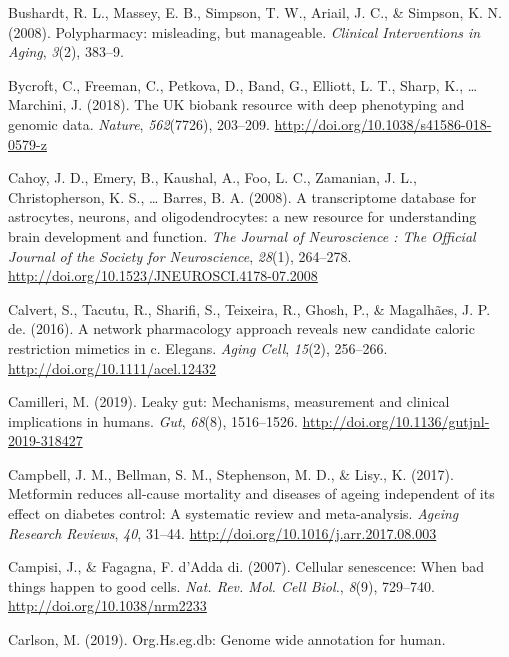 \documentclass[12pt,twoside]{unicam}
\begin{document}
\begin{cslreferences}
\leavevmode\hypertarget{ref-Bushardt2008}{}%
Bushardt, R. L., Massey, E. B., Simpson, T. W., Ariail, J. C., \& Simpson, K. N. (2008). Polypharmacy: misleading, but manageable. \emph{Clinical Interventions in Aging}, \emph{3}(2), 383--9.

\leavevmode\hypertarget{ref-Bycroft2018}{}%
Bycroft, C., Freeman, C., Petkova, D., Band, G., Elliott, L. T., Sharp, K., \ldots{} Marchini, J. (2018). The UK biobank resource with deep phenotyping and genomic data. \emph{Nature}, \emph{562}(7726), 203--209. \url{http://doi.org/10.1038/s41586-018-0579-z}

\leavevmode\hypertarget{ref-Cahoy2008}{}%
Cahoy, J. D., Emery, B., Kaushal, A., Foo, L. C., Zamanian, J. L., Christopherson, K. S., \ldots{} Barres, B. A. (2008). A transcriptome database for astrocytes, neurons, and oligodendrocytes: a new resource for understanding brain development and function. \emph{The Journal of Neuroscience : The Official Journal of the Society for Neuroscience}, \emph{28}(1), 264--278. \url{http://doi.org/10.1523/JNEUROSCI.4178-07.2008}

\leavevmode\hypertarget{ref-Calvert2016}{}%
Calvert, S., Tacutu, R., Sharifi, S., Teixeira, R., Ghosh, P., \& Magalhães, J. P. de. (2016). A network pharmacology approach reveals new candidate caloric restriction mimetics in c. Elegans. \emph{Aging Cell}, \emph{15}(2), 256--266. \url{http://doi.org/10.1111/acel.12432}

\leavevmode\hypertarget{ref-Camilleri2019}{}%
Camilleri, M. (2019). Leaky gut: Mechanisms, measurement and clinical implications in humans. \emph{Gut}, \emph{68}(8), 1516--1526. \url{http://doi.org/10.1136/gutjnl-2019-318427}

\leavevmode\hypertarget{ref-Campbell2017}{}%
Campbell, J. M., Bellman, S. M., Stephenson, M. D., \& Lisy., K. (2017). Metformin reduces all-cause mortality and diseases of ageing independent of its effect on diabetes control: A systematic review and meta-analysis. \emph{Ageing Research Reviews}, \emph{40}, 31--44. \url{http://doi.org/10.1016/j.arr.2017.08.003}

\leavevmode\hypertarget{ref-Campisi2007}{}%
Campisi, J., \& Fagagna, F. d'Adda di. (2007). Cellular senescence: When bad things happen to good cells. \emph{Nat. Rev. Mol. Cell Biol.}, \emph{8}(9), 729--740. \url{http://doi.org/10.1038/nrm2233}

\leavevmode\hypertarget{ref-Carlson2019}{}%
Carlson, M. (2019). Org.Hs.eg.db: Genome wide annotation for human.


\end{cslreferences}
\end{document}
